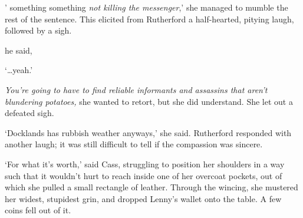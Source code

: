 '\textemdash{} something something \emph{not killing the messenger},'
she managed to mumble the rest of the sentence. This elicited from
Rutherford a half-hearted, pitying laugh, followed by a sigh.

 he said, 

`\ldots yeah.'


\textit{You're going to have to find reliable informants and assassins
  that aren't blundering potatoes,} she wanted to retort, but she did
understand. She let out a defeated sigh.

`Docklands has rubbish weather anyways,' she said. Rutherford
responded with another laugh; it was still difficult to tell if the
compassion was sincere.

`For what it's worth,' said Cass, struggling to position her shoulders
in a way such that it wouldn't hurt to reach inside one of her
overcoat pockets, out of which she pulled a small rectangle of
leather. Through the wincing, she mustered her widest, stupidest grin,
and dropped Lenny's wallet onto the table. A few coins fell out of it.
